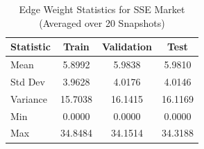 \begin{table}[H]
    \centering
    \small
    \begin{tabular}{l|ccc}
        \toprule
        \textbf{Statistic} & \textbf{Train} & \textbf{Validation} & \textbf{Test} \\
        \midrule
        Mean            & 5.8992 & 5.9838 & 5.9810 \\
        Std Dev         & 3.9628 & 4.0176 & 4.0146 \\
        Variance        & 15.7038 & 16.1415 & 16.1169 \\
        Min             & 0.0000 & 0.0000 & 0.0000 \\
        Max             & 34.8484 & 34.1514 & 34.3188 \\
        \bottomrule
    \end{tabular}
    \caption{Edge Weight Statistics for SSE Market (Averaged over 20 Snapshots)}
    \label{tab:sse_edge_weight_stats}
\end{table}